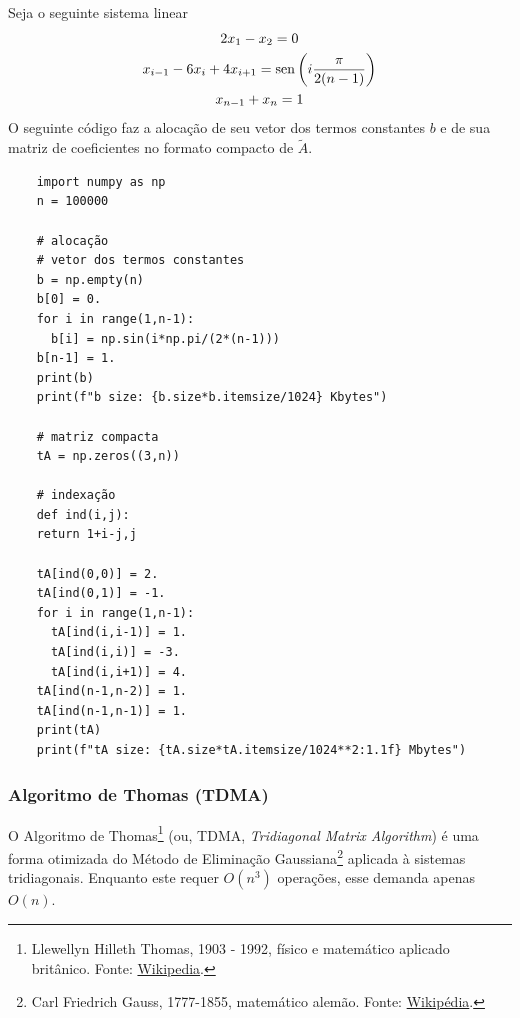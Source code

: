 \begin{ex}
  Seja o seguinte sistema linear
  \begin{gather}
    2x_1 - x_2 = 0\\
    x_{i-1} - 6x_i + 4x_{i+1} = \operatorname{sen}\left(i\frac{\pi}{2(n-1)}\right)\\
    x_{n-1} + x_n = 1
  \end{gather}
  O seguinte código {\python} faz a alocação de seu vetor dos termos constantes $b$ e de sua matriz de coeficientes no formato compacto de $\tilde{A}$.
  \begin{lstlisting}
    import numpy as np
    n = 100000
    
    # alocação
    # vetor dos termos constantes
    b = np.empty(n)
    b[0] = 0.
    for i in range(1,n-1):
      b[i] = np.sin(i*np.pi/(2*(n-1)))
    b[n-1] = 1.
    print(b)
    print(f"b size: {b.size*b.itemsize/1024} Kbytes")

    # matriz compacta
    tA = np.zeros((3,n))

    # indexação
    def ind(i,j):
    return 1+i-j,j

    tA[ind(0,0)] = 2.
    tA[ind(0,1)] = -1.
    for i in range(1,n-1):
      tA[ind(i,i-1)] = 1.
      tA[ind(i,i)] = -3.
      tA[ind(i,i+1)] = 4.
    tA[ind(n-1,n-2)] = 1.
    tA[ind(n-1,n-1)] = 1.
    print(tA)
    print(f"tA size: {tA.size*tA.itemsize/1024**2:1.1f} Mbytes")
  \end{lstlisting}
\end{ex}

\subsubsection{Algoritmo de Thomas (TDMA)}

O Algoritmo de Thomas\footnote{Llewellyn Hilleth Thomas, 1903 - 1992, físico e matemático aplicado britânico. Fonte: \href{https://en.wikipedia.org/wiki/Llewellyn_Thomas}{Wikipedia}.} (ou, TDMA, {\it Tridiagonal Matrix Algorithm}) é uma forma otimizada do Método de Eliminação Gaussiana\footnote{Carl Friedrich Gauss, 1777-1855, matemático alemão. Fonte: \href{https://en.wikipedia.org/wiki/Carl_Friedrich_Gauss}{Wikipédia}.} aplicada à sistemas tridiagonais. Enquanto este requer $O(n^3)$ operações, esse demanda apenas $O(n)$.

